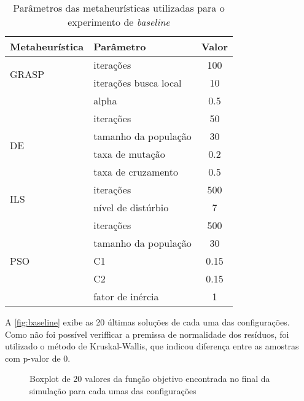 \begin{table}[ht!]
    \centering
    \caption{Parâmetros das metaheurísticas utilizadas para o experimento de \textit{baseline}}
    \begin{tabular}{llc}
        \toprule
         \textbf{Metaheurística} & \textbf{Parâmetro} & \textbf{Valor} \\
         \midrule
         \multirow{2}{*}{GRASP} & iterações                 & 100\\
                                & iterações busca local     & 10\\
                                & alpha                     & 0.5\\
         \hline
         \multirow{4}{*}{DE}    & iterações                 & 50\\
                                & tamanho da população      & 30\\
                                & taxa de mutação           & 0.2\\
                                & taxa de cruzamento        & 0.5\\
        \hline
        \multirow{2}{*}{ILS}    & iterações                 & 500\\
                                & nível de distúrbio        & 7\\
        \hline
        \multirow{5}{*}{PSO}    & iterações                 & 500\\
                                & tamanho da população      & 30\\
                                & C1                        & 0.15\\
                                & C2                        & 0.15\\
                                & fator de inércia          & 1\\
        \bottomrule
    \end{tabular}
    \label{tab:configExpBaseline}
\end{table}

A \autoref{fig:baseline} exibe as 20 últimas soluções de cada uma das configurações. Como não foi possível verifficar a premissa de normalidade dos resíduos, foi utilizado o método de Kruskal-Wallis, que indicou diferença entre as amostras com p-valor de $0$.

\begin{figure}
\centering

\caption{Boxplot de 20 valores da  função objetivo encontrada no final da simulação para cada umas das configurações}
\label{fig:baseline}
\end{figure}

